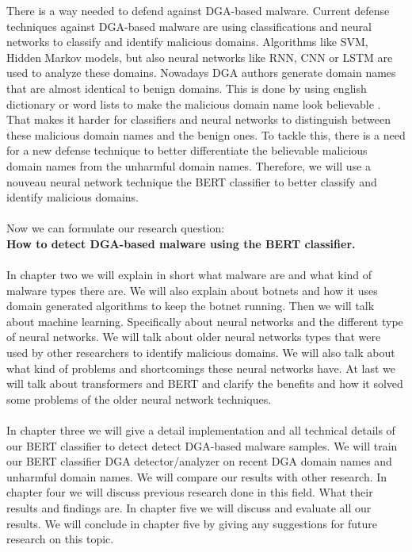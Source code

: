 There is a way needed to defend against DGA-based malware. Current defense techniques against DGA-based malware are using classifications and neural networks to classify and identify malicious domains. Algorithms like SVM, Hidden Markov models, but also neural networks like RNN, CNN or LSTM are used to analyze these domains. Nowadays DGA authors generate domain names that are almost identical to benign domains. This is done by using english dictionary or word lists to make the malicious domain name look believable \cite{arntz_2016}. That makes it harder for classifiers and neural networks to distinguish between these malicious domain names and the benign ones. To tackle this, there is a need for a new defense technique to better differentiate the believable malicious domain names from the unharmful domain names. Therefore, we will use a nouveau neural network technique the BERT classifier to better classify and identify malicious domains.\\\\
Now we can formulate our research question:\\ \textbf{How to detect DGA-based malware using the BERT classifier.}\\\\
In chapter two we will explain in short what malware are and what kind of malware types there are. We will also explain about botnets and how it uses domain generated algorithms to keep the botnet running. Then we will talk about machine learning. Specifically about neural networks and the different type of neural networks. We will talk about older neural networks types that were used by other researchers to identify malicious domains. We will also talk about what kind of problems and shortcomings these neural networks have. At last we will talk about transformers and BERT and clarify the benefits and how it solved some problems of the older neural network techniques.\\\\
In chapter three we will give a detail implementation and all technical details of our BERT classifier to detect detect DGA-based malware samples. We will train our BERT classifier DGA detector/analyzer on recent DGA domain names and unharmful domain names. We will compare our results with other research. In chapter four we will discuss previous research done in this field. What their results and findings are. In chapter five we will discuss and evaluate all our results. We will conclude in chapter five by giving any suggestions for future research on this topic.
